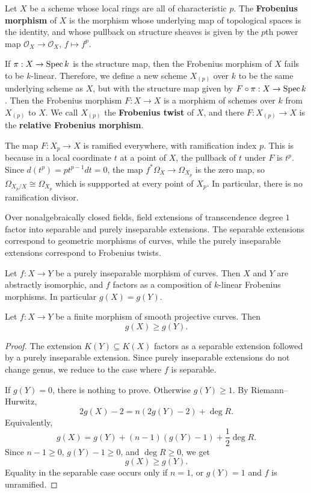 \documentclass[12pt]{article}
\begin{document}
\begin{definition}
    Let $X$ be a scheme whose local rings are all of characteristic $p$. The \textbf{Frobenius morphism} of $X$ is the morphism whose underlying map of topological spaces is the identity, and whose pullback on structure sheaves is given by the $p$th power map $\mathcal O_X\to \mathcal O_X$, $f\mapsto f^p$.
\end{definition}
If $\pi: X\to \operatorname{Spec} k$ is the structure map, then the Frobenius morphism of $X$ fails to be $k$-linear. Therefore, we define a new scheme $X_{(p)}$ over $k$ to be the same underlying scheme as $X$, but with the structure map given by $F\circ \pi:X\to \operatorname{Spec} k$. Then the Frobenius morphism $F:X\to X$ is a morphism of schemes over $k$ from $X_{(p)}$ to $X$. We call $X_{(p)}$ the \textbf{Frobenius twist} of $X$, and there $F:X_{(p)}\to X$ is the \textbf{relative Frobenius morphism}.

\begin{example}
    The map $F:X_p\to X$ is ramified everywhere, with ramification index $p$. This is because in a local coordinate $t$ at a point of $X$, the pullback of $t$ under $F$ is $t^p$. Since $d(t^p)=pt^{p-1}dt=0$, the map $f^*\Omega_X\to \Omega_{X_p}$ is the zero map, so $\Omega_{X_p/X}\cong \Omega_{X_p}$ which is suppported at every point of $X_p$. In particular, there is no ramification divisor.
\end{example}

Over nonalgebraically closed fields, field extensions of transcendence degree $1$ factor into separable and purely inseparable extensions. The separable extensions correspond to geometric morphisms of curves, while the purely inseparable extensions correspond to Frobenius twists.


\begin{proposition}
    Let $f:X\to Y$ be a purely inseparable morphism of curves. Then $X$ and $Y$ are abstractly isomorphic, and $f$ factors as a composition of $k$-linear Frobenius morphisms. In particular $g(X)=g(Y)$.
\end{proposition}


\begin{theorem}
    Let \(f:X\to Y\) be a finite morphism of smooth projective curves. Then
    \[
        g(X)\ge g(Y).
    \]
\end{theorem}

\begin{proof}
    The extension \(K(Y)\subseteq K(X)\) factors as a separable extension followed by a purely inseparable extension. Since purely inseparable extensions do not change genus, we reduce to the case where \(f\) is separable.

    If \(g(Y)=0\), there is nothing to prove. Otherwise \(g(Y)\ge 1\). By Riemann--Hurwitz,
    \[
        2g(X)-2=n(2g(Y)-2)+\deg R.
    \]
    Equivalently,
    \[
        g(X)=g(Y)+(n-1)(g(Y)-1)+\frac{1}{2}\deg R.
    \]
    Since \(n-1\ge 0\), \(g(Y)-1\ge 0\), and \(\deg R\ge 0\), we get
    \[
        g(X)\ge g(Y).
    \]
    Equality in the separable case occurs only if \(n=1\), or \(g(Y)=1\) and \(f\) is unramified.
\end{proof}
\end{document}
